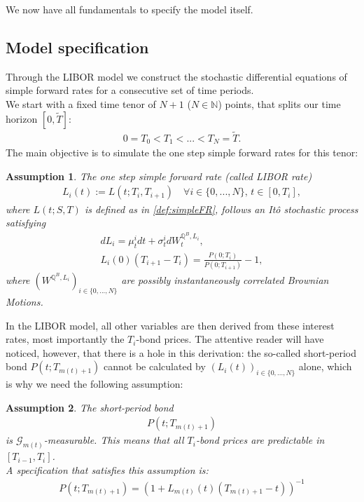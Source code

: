 \documentclass[12pt]{article}
\newtheorem{assumption}{Assumption}[section]
\begin{document}
	We now have all fundamentals to specify the model itself.
	
	\subsection{Model specification}\label{sec:libModel}
	Through the LIBOR model we construct the stochastic differential equations of simple forward rates for a consecutive set of time periods.\\
	We start with a fixed time tenor of $N+1$ ($N \in \mathbb{N}$) points, that splits our time horizon $[0,\tilde{T}]$:
	\begin{align*}
		0 = T_0 < T_1 < ... < T_N = \tilde{T}.
	\end{align*}
	The main objective is to simulate the one step simple forward rates for this tenor:
	\begin{assumption}\label{as:LIBORisItoProcess}
		The one step simple forward rate (called LIBOR rate)
		\begin{align*}
			L_i(t) := L(t;T_i, T_{i+1}) \quad \forall i \in \{0, ..., N\}\text{, } t\in[0,T_i],
		\end{align*}
		where $L(t;S, T)$ is defined as in \cref{def:simpleFR},
		follows an Itô stochastic process satisfying
		\begin{align}
			dL_i = \mu^i_t dt + \sigma^i_t dW^{\mathbb{Q}^B, L_i}_t,\label{eq:LMMSDE}\\
			L_i(0)(T_{i+1} - T_i) = \frac{P(0;T_i)}{P(0;T_{i+1})} - 1,
		\end{align}
		where $(W^{\mathbb{Q}^B, L_i})_{i\in \{0, ..., N\}}$ are possibly instantaneously correlated Brownian Motions.
	\end{assumption}
	In the LIBOR model, all other variables are then derived from these interest rates, most importantly the $T_i$-bond prices. The attentive reader will have noticed, however, that there is a hole in this derivation: the so-called short-period bond $P(t;T_{m(t)+1})$ cannot be calculated by $(L_i(t))_{i\in\{0, ..., N\}}$ alone, which is why we need the following assumption:
	\begin{assumption}\label{as:LMMShortPeriodBond}
		The short-period bond
		\begin{align*}
			P(t;T_{m(t)+1})
		\end{align*}
		is $\mathcal{G}_{m(t)}$-measurable. This means that all $T_i$-bond prices are predictable in $[T_{i-1},T_i]$.\\
		A specification that satisfies this assumption is:
		\begin{align*}
			P(t;T_{m(t)+1}) = \left(1 + L_{m(t)}(t)\left(T_{m(t)+1} - t\right)\right)^{-1}
		\end{align*}
	\end{assumption}
\end{document}
